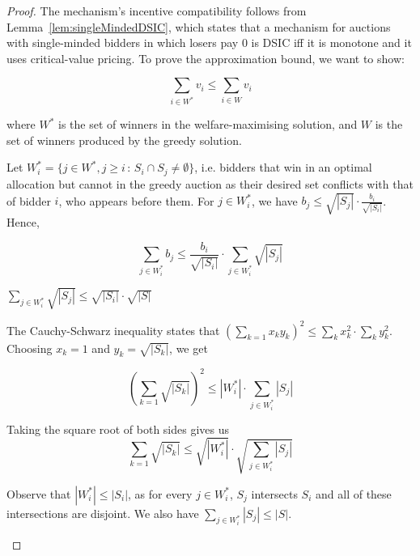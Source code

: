 \begin{proof}
	The mechanism's incentive compatibility follows from
	Lemma~\ref{lem:singleMindedDSIC}, which states that a mechanism for
	auctions with single-minded bidders in which losers pay 0 is DSIC iff it is
	monotone and it uses critical-value pricing.  To prove the approximation
	bound, we want to show:

	\begin{equation*}
		\sum_{i \in W^*} v_i \le \sum_{i \in W} v_i
	\end{equation*}

	where $W^*$ is the set of winners in the welfare-maximising solution, and
	$W$ is the set of winners produced by the greedy solution.

	Let $W^*_i = \{ j \in W^*, j \ge i \, : \, S_i \cap S_j \neq \emptyset \}$,
	i.e. bidders that win in an optimal allocation but cannot in the greedy
	auction as their desired set conflicts with that of bidder $i$, who appears
	before them. For $j \in W^*_i$, we have $b_j \le \sqrt{|S_j|} \cdot
	\frac{b_i}{\sqrt{|S_i|}}$. Hence,

	\begin{equation*}
		\sum_{j \in W^*_i} b_j \le \frac{b_i}{\sqrt{|S_i|}} \cdot
		\sum_{j \in W^*_i} \sqrt{|S_j|}
	\end{equation*}

	\begin{claim}
		$\sum_{j \in W^*_i} \sqrt{|S_j|} \le \sqrt{|S_i|} \cdot
		\sqrt{|S|}$
	\end{claim}

	\begin{subproof}
		The Cauchy-Schwarz inequality states that $(\sum_{k=1} x_k y_k)^2 \le
		\sum_k x_k^2 \cdot \sum_k y_k^2$. Choosing $x_k = 1$ and $y_k =
		\sqrt{|S_k|}$, we get

		\begin{equation*}
			(\sum_{k=1} \sqrt{|S_k|})^2 \le |W^*_i| \cdot \sum_{j
			\in W^*_i} |S_j|
		\end{equation*}

		Taking the square root of both sides gives us
		\begin{equation*}
			\sum_{k=1} \sqrt{|S_k|} \le \sqrt{|W^*_i|} \cdot
			\sqrt{\sum_{j \in W^*_i} |S_j|}
		\end{equation*}

		Observe that $|W^*_i| \le |S_i|$, as for every $j \in W^*_i$, $S_j$
		intersects $S_i$ and all of these intersections are disjoint. We also
		have $\sum_{j \in W^*_i} |S_j| \le |S|$.
	\end{subproof}


\end{proof}
